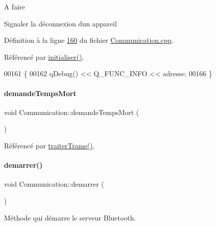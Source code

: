 \begin{DoxyRefDesc}{A faire}
\item[\hyperlink{todo__todo000003}{A faire}]Signaler la déconnexion d\textquotesingle{}un appareil \end{DoxyRefDesc}


Définition à la ligne \hyperlink{_communication_8cpp_source_l00160}{160} du fichier \hyperlink{_communication_8cpp_source}{Communication.\+cpp}.



Référencé par \hyperlink{_communication_8cpp_source_l00044}{initialiser()}.


\begin{DoxyCode}
00161 \{
00162     qDebug() << Q\_FUNC\_INFO << adresse;
00166 \}
\end{DoxyCode}
\mbox{\label{class_communication_ab2dd9f10ceaba18016017104683b6fc1}} 
\paragraph{\texorpdfstring{demande\+Temps\+Mort}{demandeTempsMort}}
{\footnotesize\ttfamily void Communication\+::demande\+Temps\+Mort (\begin{DoxyParamCaption}{ }\end{DoxyParamCaption})\hspace{0.3cm}{\ttfamily [signal]}}



Référencé par \hyperlink{_communication_8cpp_source_l00208}{traiter\+Trame()}.

\mbox{\label{class_communication_af29ea9a1c2ce29436f2331c322f6ebbf}} 
\paragraph{\texorpdfstring{demarrer()}{demarrer()}}
{\footnotesize\ttfamily void Communication\+::demarrer (\begin{DoxyParamCaption}{ }\end{DoxyParamCaption})}



Méthode qui démarre le serveur Bluetooth. 

